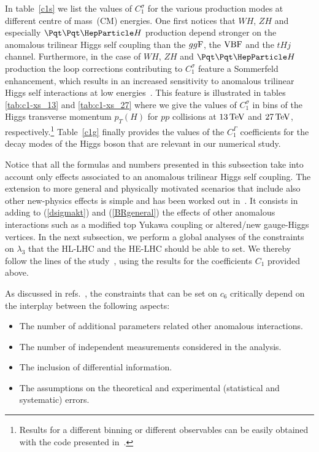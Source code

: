 In table~\ref{c1s} we list the values of $C_1^{\sigma}$ for the various production modes at different centre of mass~(CM) energies. One first notices that ${WH}$, ${ZH}$ and especially ${\tth}$ production depend stronger on the anomalous trilinear Higgs self coupling than the $gg{\rm F}$, the ${\rm VBF}$ and the $t H j$ channel.  Furthermore, in the case of ${WH}$, ${ZH}$  and ${\tth}$ production the loop corrections contributing to $C_1^{\sigma}$ feature a Sommerfeld enhancement, which results in an increased sensitivity to anomalous trilinear Higgs self interactions at low energies~\cite{Degrassi:2016wml,Bizon:2016wgr,Maltoni:2017ims}. This feature is illustrated in tables \ref{tab:c1-xs_13} and \ref{tab:c1-xs_27} where we give  the values of $C_1^{\sigma}$ in bins of the Higgs transverse momentum $p_T(H)$  for $pp$ collisions at $13 \, {\rm TeV}$ and $27 \, {\rm TeV}$, respectively.\footnote{Results for a different binning or different observables can be easily obtained with the code presented in~\cite{Maltoni:2017ims}.} Table~\ref{c1g} finally provides the values of  the $C_1^{\Gamma}$ coefficients for the decay modes of the Higgs boson that are relevant in our numerical study. 

Notice that all the formulas and numbers presented in this subsection take into account only  effects associated to an anomalous trilinear Higgs self coupling. The extension to more general and physically motivated scenarios that include also other new-physics effects is simple and has been worked out in~\cite{DiVita:2017eyz,Maltoni:2017ims}. It consists in adding to  (\ref{dsigmakt}) and (\ref{BRgeneral}) the effects of other anomalous  interactions such as a modified top Yukawa coupling or altered/new gauge-Higgs vertices. In the next subsection, we perform a global analyses of the constraints on $\lambda_3$ that the HL-LHC and the HE-LHC should be able to set.    We thereby follow the  lines of the study~\cite{DiVita:2017eyz}, using the results for the coefficients $C_1$ provided above.




 As discussed in refs.~\cite{Maltoni:2017ims, DiVita:2017eyz}, the constraints  that can be set on $c_6$ critically depend on the interplay between the following aspects:
\begin{itemize}
\item The number of additional parameters related other anomalous interactions.
\item The number of independent measurements considered in the analysis.
\item The inclusion of differential information.
\item The assumptions on the theoretical and experimental (statistical and systematic) errors.
\end{itemize}
   
